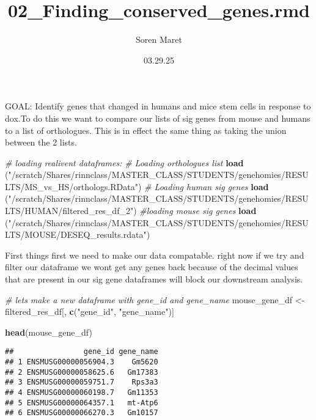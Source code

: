 \documentclass[
]{article}
\title{02\_Finding\_conserved\_genes.rmd}
\author{Soren Maret}
\date{03.29.25}
\newenvironment{Shaded}{\begin{snugshade}}{\end{snugshade}}
\newcommand{\CommentTok}[1]{\textcolor[rgb]{0.56,0.35,0.01}{\textit{#1}}}
\newcommand{\FunctionTok}[1]{\textcolor[rgb]{0.13,0.29,0.53}{\textbf{#1}}}
\newcommand{\NormalTok}[1]{#1}
\newcommand{\OtherTok}[1]{\textcolor[rgb]{0.56,0.35,0.01}{#1}}
\newcommand{\StringTok}[1]{\textcolor[rgb]{0.31,0.60,0.02}{#1}}
\begin{document}
\maketitle

GOAL: Identify genes that changed in humans and mice stem cells in
response to dox.To do this we want to compare our lists of sig genes
from mouse and humans to a list of orthologues. This is in effect the
same thing as taking the union between the 2 lists.

\begin{Shaded}
\begin{Highlighting}[]
\CommentTok{\# loading realivent dataframes:}
\CommentTok{\# Loading orthologues list}
\FunctionTok{load}\NormalTok{ (}\StringTok{"/scratch/Shares/rinnclass/MASTER\_CLASS/STUDENTS/genehomies/RESULTS/MS\_vs\_HS/orthologs.RData"}\NormalTok{)}
\CommentTok{\# Loading human sig genes}
\FunctionTok{load}\NormalTok{ (}\StringTok{"/scratch/Shares/rinnclass/MASTER\_CLASS/STUDENTS/genehomies/RESULTS/HUMAN/filtered\_res\_df\_2"}\NormalTok{)}
\CommentTok{\#loading mouse sig genes}
\FunctionTok{load}\NormalTok{ (}\StringTok{"/scratch/Shares/rinnclass/MASTER\_CLASS/STUDENTS/genehomies/RESULTS/MOUSE/DESEQ\_results.rdata"}\NormalTok{)}
\end{Highlighting}
\end{Shaded}

First things first we need to make our data compatable. right now if we
try and filter our dataframe we wont get any genes back because of the
decimal values that are present in our sig gene dataframes will block
our downstream analysis.

\begin{Shaded}
\begin{Highlighting}[]
\CommentTok{\# lets make a new dataframe with gene\_id and gene\_name}
\NormalTok{mouse\_gene\_df }\OtherTok{\textless{}{-}}\NormalTok{ filtered\_res\_df[, }\FunctionTok{c}\NormalTok{(}\StringTok{"gene\_id"}\NormalTok{, }\StringTok{"gene\_name"}\NormalTok{)]}

\FunctionTok{head}\NormalTok{(mouse\_gene\_df)}
\end{Highlighting}
\end{Shaded}

\begin{verbatim}
##                gene_id gene_name
## 1 ENSMUSG00000056904.3    Gm5620
## 2 ENSMUSG00000058625.6   Gm17383
## 3 ENSMUSG00000059751.7    Rps3a3
## 4 ENSMUSG00000060198.7   Gm11353
## 5 ENSMUSG00000064357.1   mt-Atp6
## 6 ENSMUSG00000066270.3   Gm10157
\end{verbatim}
\end{document}
